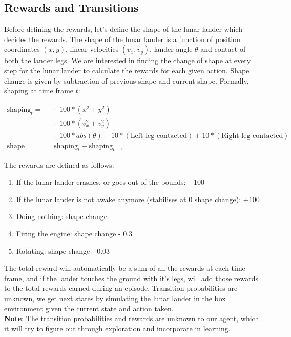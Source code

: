 \subsection{Rewards and Transitions}

Before defining the rewards, let's define the shape of the lunar lander which decides the rewards. The shape of the lunar lander is a function of position coordinates $(x, y)$, linear velocities $(v_x, v_y)$, lander angle $\theta$ and contact of both the lander legs. We are interested in finding the change of shape at every step for the lunar lander to calculate the rewards for each given action. Shape change is given by subtraction of previous shape and current shape. Formally, shaping at time frame $t$:

\begin{align*}
\text{shaping}_{t} = &- 100*(x^2 + y^2) \\
           & - 100*(v_x^2 + v_y^2) \\
            &- 100*abs(\theta) + 10*(\text{Left leg contacted}) + 10*(\text{Right leg contacted}) \\
\text{shape change} = & \text{shaping}_t - \text{shaping}_{t-1}
\end{align*}

The rewards are defined as follows:

\begin{enumerate}
\item If the lunar lander crashes, or goes out of the bounds: $-100$
\item If the lunar lander is not awake anymore (stabilises at 0 shape change): $+100$
\item Doing nothing: shape change 
\item Firing the engine: shape change - 0.3
\item Rotating: shape change - 0.03
\end{enumerate}

The total reward will automatically be a sum of all the rewards at each time frame, and if the lander touches the ground with it's legs, will add those rewards to the total rewards earned during an episode. Transition probabilities are unknown, we get next states by simulating the lunar lander in the box environment given the current state and action taken. \\

\textbf{Note}: The transition probabilities and rewards are unknown to our agent, which it will try to figure out through exploration and incorporate in learning. 

